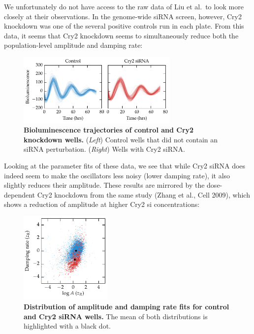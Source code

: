 \documentclass[11pt, letterpaper]{article}
\begin{document}
We unfortunately do not have access to the raw data of Liu et al.\ to look more closely at their observations. In the genome-wide siRNA screen, however, Cry2 knockdown was one of the several positive controls run in each plate.
From this data, it seems that Cry2 knockdown seems to simultaneously reduce both the population-level amplitude and damping rate:

\begin{figure}[h!]
  \begin{center}
    \includegraphics[width=0.7\textwidth]{response_figs/cry2_ts.pdf}
  \end{center}
  \caption{{\bfseries Bioluminescence trajectories of control and Cry2 knockdown wells.} ({\itshape Left}) Control wells that did not contain an siRNA perturbation. ({\itshape Right}) Wells with Cry2 siRNA.}
\end{figure}

Looking at the parameter fits of these data, we see that while Cry2 siRNA does indeed seem to make the oscillators less noisy (lower damping rate), it also slightly reduces their amplitude. These results are mirrored by the dose-dependent Cry2 knockdown from the same study (Zhang et al., Cell 2009), which shows a reduction of amplitude at higher Cry2 si concentrations:
\clearpage

\begin{figure}[h!]
  \begin{center}
    \includegraphics[width=0.4\textwidth]{response_figs/cry2_dist.pdf}
  \end{center}
  \caption{{\bfseries Distribution of amplitude and damping rate fits for control and Cry2 siRNA wells.} The mean of both distributions is highlighted with a black dot.}
\end{figure}
\end{document}
